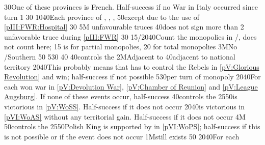 {}{30}{One of these provinces is French. Half-success if no War in Italy
  occurred since turn 1}%
%
%
%
{}{30}{}%
%
%
%
{10}{40}{Each province of \provinceArtois, \provinceBresse,
  , \provinceRoussillon}%
%
%
%
{}{50}{except due to the use of \ref{pIII:FWR:Hospital}}%
%
%
%
{}{30}{}%
%
%
\EUobjective5M{ unfavourable truces}{}%
{}{40}{\paysmajeurFrance does not sign more than 2 unfavorable truce during
  \ref{pIII:FWR}}%
%
%
%
{}{30}{}%
%
%
%
{15/20}{40}{Count the monopolies in \STZ/\CTZ,  does not count
  here; 15 is for partial monopolies, 20 for total monopolies}%
%
%
\EUobjective3M{No \GE/Southern \HRE}{}%
{}{50}{}%
%
%
{5}{30}{}%
%
%
{}{40}{}%
%
%
%
{}{40}{\paysmajeurFrance controls the }%
%
\EUobjective2M{Adjacent to \paysmajeurHollande}{}%
{}{40}{\paysmajeurFrance adjacent to \paysmajeurHollande national territory}%
%
%
{20}{40}{This probably means that \paysmajeurFrance has to control the Rebels
  in \ref{pV:Glorious Revolution} and win; half-success if not possible}%
%
%
{5}{30}{per turn of  monopoly}%
%
%
{20}{40}{For each won war in \ref{pV:Devolution War}, \ref{pV:Chamber of
    Reunion} and \ref{pV:League Augsburg}. If none of these events occur,
  half-success}%
%
%
%
{}{40}{\paysmajeurFrance controls the }%
%
%
{25}{50}{\FRA is victorious in \ref{pV:WoSS}. Half-success if it does not
  occur}%
%
%
{20}{40}{\FRA is victorious in \ref{pVI:WoAS} without any territorial
  gain. Half-success if it does not occur}%
%
\EUobjective4M{}{}%
{}{50}{\paysmajeurFrance controls the }%
%
%
{25}{50}{Polish King is supported by \FRA in \ref{pVI:WoPS}; half-success if
  this is not possible or if the event does not occur}%
%
%
\EUobjective1M{\payspologne still exists}{}%
{}{50}{}%
%
%
{20}{40}{For each }%
